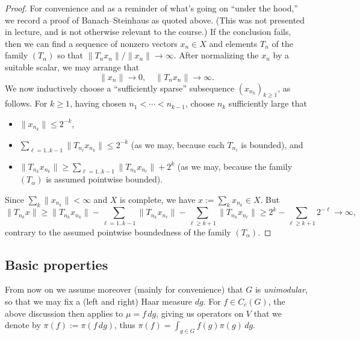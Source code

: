 \documentclass[reqno]{amsart} 
\begin{document}
\begin{proof}
  For convenience and as a reminder of what's going on ``under the hood,'' we record a proof of Banach--Steinhaus as quoted above.  (This was not presented in lecture, and is not otherwise relevant to the course.)  If the conclusion fails, then we can find a sequence of nonzero vectors $x_n \in X$ and elements $T_n$ of the family $(T_\alpha)$ so that $\|T_n x_n\|/ \|x_n\| \rightarrow \infty$.  After normalizing the $x_n$ by a suitable scalar, we may arrange that
  \begin{equation*}
    \| x_n\| \rightarrow 0, \quad \|T_n x_n\| \rightarrow \infty.
  \end{equation*}
  We now inductively choose a ``sufficiently sparse'' subsequence $(x_{n_k})_{k \geq 1}$, as follows.  For $k \geq 1$, having chosen $n_1 < \dotsb < n_{k-1}$, choose $n_{k}$ sufficiently large that
  \begin{itemize}
  \item $\|x_{n_{k}}\| \leq 2^{-k}$,
  \item $\sum_{\ell=1..k-1} \|T_{n_{\ell}} x_{n_{k}} \| \leq 2^{-k}$ (as we may, because each $T_{n_{\ell}}$ is bounded), and
  \item $\|T_{n_{k}} x_{n_{k}} \| \geq \sum_{\ell =1..k-1} \| T_{n_{k}} x_{n_{\ell}} \| + 2^{k}$ (as we may, because the family $(T_\alpha)$ is assumed pointwise bounded).
  \end{itemize}
  Since $\sum_{k} \|x_{n_k}\| < \infty$ and $X$ is complete, we have $x := \sum_k x_{n_k} \in X$.  But
  \begin{equation*}
    \|T_{n_k} x\| \geq \|T_{n_k} x_{n_k}\| - \sum_{\ell=1..k-1} \| T_{n_{k}} x_{n_{\ell}} \| - \sum_{\ell \geq k+1} \| T_{n_{k}} x_{n_{\ell}} \| \geq 2^k - \sum_{\ell \geq k+1} 2^{-\ell} \rightarrow \infty,
  \end{equation*}
  contrary to the assumed pointwise boundedness of the family $(T_\alpha)$.
\end{proof}

\subsection{Basic properties}\label{sec:cnh2vosg76}
From now on we assume moreover (mainly for convenience) that $G$ is \emph{unimodular}, so that we may fix a (left and right) Haar measure $d g$.  For $f \in C_c(G)$, the above discussion then applies to $\mu = f \, d g$, giving us operators on $V$ that we denote by $\pi(f) := \pi(f \, d g)$, thus $\pi(f) = \int_{g \in G} f(g) \pi(g) \, d g$.
\end{document}
